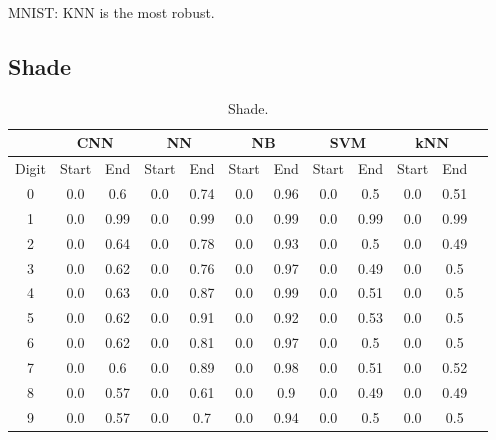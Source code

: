 MNIST: KNN is the most robust. 

\subsection{Shade}
\begin{table}[ht]
\centering
\begin{tabular}{|c|c|c|c|c|c|c|c|c|c|c|c|}
\hline
 & \multicolumn{2}{c}{\textbf{CNN}} &  \multicolumn{2}{|c|}{\textbf{NN}} &\multicolumn{2}{c}{\textbf{NB}} & \multicolumn{2}{|c|}{\textbf{SVM}} & \multicolumn{2}{c|}{\textbf{kNN}} \\
\hline
Digit  &   Start & End & Start & End & Start & End & Start & End & Start & End \\
\hline
0  &   0.0&0.6 & 0.0&0.74 & 0.0&0.96 & 0.0&0.5 & 0.0&0.51 \\
\hline
1  &   0.0&0.99 & 0.0&0.99 & 0.0&0.99 & 0.0&0.99 & 0.0&0.99 \\
\hline
2  &   0.0&0.64 & 0.0&0.78 & 0.0&0.93 & 0.0&0.5 & 0.0&0.49 \\
\hline
3  &   0.0&0.62 & 0.0&0.76 & 0.0&0.97 & 0.0&0.49 & 0.0&0.5  \\
\hline
4  &   0.0&0.63 & 0.0&0.87 & 0.0&0.99 & 0.0&0.51 & 0.0&0.5 \\
\hline
5  &   0.0&0.62 & 0.0&0.91 & 0.0&0.92 & 0.0&0.53 & 0.0&0.5  \\
\hline
6  &   0.0&0.62 & 0.0&0.81 & 0.0&0.97 & 0.0&0.5 & 0.0&0.5 \\
\hline
7  &   0.0&0.6 & 0.0&0.89 & 0.0&0.98 & 0.0&0.51 & 0.0&0.52\\
\hline
8  &   0.0&0.57 & 0.0&0.61 & 0.0&0.9 & 0.0&0.49 & 0.0&0.49\\
\hline
9  &   0.0&0.57 & 0.0&0.7 & 0.0&0.94 & 0.0&0.5 & 0.0&0.5\\ 
\hline
\end{tabular}
\caption{Shade.}
\label{tbl:test-file-format}
\end{table}

